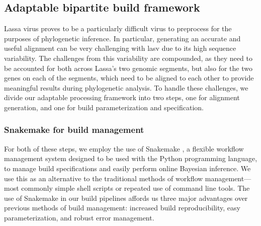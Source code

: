 \subsection{Adaptable bipartite build framework}

Lassa virus proves to be a particularly difficult virus to preprocess for the purposes of phylogenetic inference.
In particular, generating an accurate and useful alignment can be very challenging with \gls{lasv} due to its high sequence variability.
The challenges from this variability are compounded, as they need to be accounted for both across Lassa's two genomic segments, but also for the two genes on each of the segments, which need to be aligned to each other to provide meaningful results during phylogenetic analysis.
To handle these challenges, we divide our adaptable processing framework into two steps, one for alignment generation, and one for build parameterization and specification.

\subsubsection{Snakemake for build management}

For both of these steps, we employ the use of Snakemake \cite{koster2012snakemake}, a flexible workflow management system designed to be used with the Python programming language, to manage build specifications and easily perform online Bayesian inference.
We use this as an alternative to the traditional methods of workflow management---most commonly simple shell scripts or repeated use of command line tools.
The use of Snakemake in our build pipelines affords us three major advantages over previous methods of build management: increased build reproducibility, easy parameterization, and robust error management.

